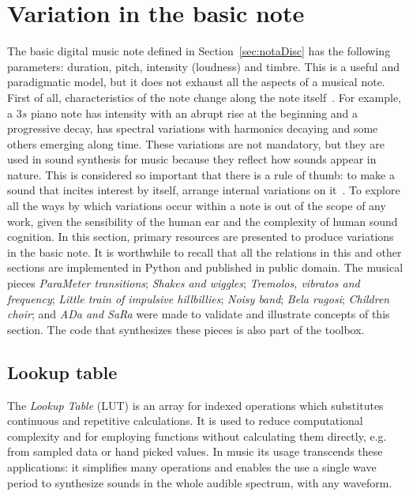 \section{Variation in the basic note}\label{sec:internalVar}\label{sec:varInternas}
The basic digital music note defined in Section~\ref{sec:notaDisc} has the following parameters: duration, pitch, intensity (loudness) and timbre. This is a useful and paradigmatic model, but it does not exhaust all the aspects of a musical note. First of all, characteristics of the note change along the note itself~\cite{Chowning}. For example, a $3s$ piano note has intensity with an abrupt rise at the beginning and a progressive decay, has spectral variations with harmonics decaying and some others emerging along time. These variations are not mandatory, but they are used in sound synthesis for music because they reflect how sounds appear in nature. This is considered so important that there is a rule of thumb: to make a sound that incites interest by itself, arrange internal variations on it~\cite{Roederer}.
To explore all the ways by which variations occur within a note is out of the scope of any work, given the sensibility of the human ear and the complexity of human sound cognition. In this section, primary resources are presented to produce variations in the basic note. It is worthwhile to recall that all the relations in this and other sections are implemented in Python and published in public domain. The musical pieces \emph{ParaMeter transitions}; \emph{Shakes and wiggles}; \emph{Tremolos, vibratos and frequency}; \emph{Little train of impulsive hillbillies}; \emph{Noisy band}; \emph{Bela rugosi}; \emph{Children choir}; and \emph{ADa and SaRa} were made to validate and illustrate concepts of this section. The code that synthesizes these pieces is also part of the toolbox.~\cite{MASSA}
 
\subsection{Lookup table}\label{subsec:lookup}
The \emph{Lookup Table} (LUT) is an array for indexed operations which substitutes continuous and repetitive calculations.
It is used to reduce computational complexity and for employing functions without calculating them directly, e.g. from sampled data or hand picked values.
In music its usage transcends these applications: it simplifies many operations and enables the use a single wave period to synthesize sounds in the whole audible spectrum, with any waveform.

